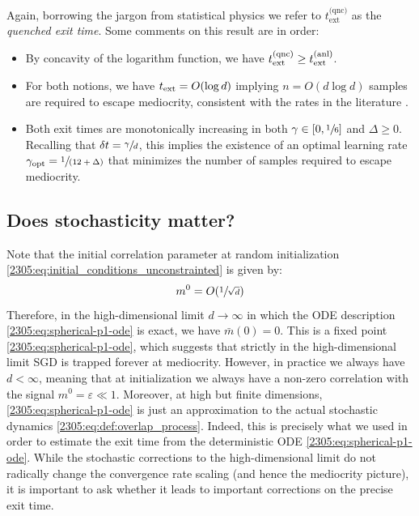 Again, borrowing the jargon from statistical physics we refer to $t_\text{ext}^\text{(qnc)}$ as the \emph{quenched exit time}. Some comments on this result are in order:
\begin{itemize}
    \item By concavity of the logarithm function, we have $t^{\rm (qnc)}_{\rm ext}\geq t^{\rm (anl)}_{\rm ext}$.
    \item For both notions, we have $t_{\rm ext} = O(\log{d})$ implying $n=O(d\log{d})$ samples are required to escape mediocrity, consistent with the rates in the literature \citep{chen2019gradient,tan2019online,arous2021online}.
    \item Both exit times are monotonically increasing in both $\gamma\in[0,\sfrac{1}{6}]$ and $\Delta\geq 0$. Recalling that $\delta t = \sfrac{\gamma}{d}$, this implies the existence of an optimal learning rate $\gamma_{\rm opt}=\sfrac{1}{(12+\Delta)}$ that minimizes the number of samples required to escape mediocrity.
\end{itemize}

\subsection{Does stochasticity matter?} \label{2305:sec:sde_p1}
Note that the initial correlation parameter at random initialization \eqref{2305:eq:initial_conditions_unconstrainted} is given by:
\begin{align}
    m^{0} = O(\sfrac{1}{\sqrt{d}})
\end{align}
Therefore, in the high-dimensional limit $d\to\infty$ in which the ODE description \eqref{2305:eq:spherical-p1-ode} is exact, we have $\bar{m}(0) = 0$. This is a fixed point \eqref{2305:eq:spherical-p1-ode}, which suggests that strictly in the high-dimensional limit SGD is trapped forever at mediocrity. However, in practice we always have $d<\infty$, meaning that at initialization we always have a non-zero correlation with the signal $m^{0}=\varepsilon \ll 1$. Moreover, at high but finite dimensions, \eqref{2305:eq:spherical-p1-ode} is just an approximation to the actual stochastic dynamics \eqref{2305:eq:def:overlap_process}. Indeed, this is precisely what we used in order to estimate the exit time from the deterministic ODE \eqref{2305:eq:spherical-p1-ode}. While the stochastic corrections to the high-dimensional limit do not radically change the convergence rate scaling \citep{tan2019online} (and hence the mediocrity picture), it is important to ask whether it leads to important corrections on the precise exit time. 

